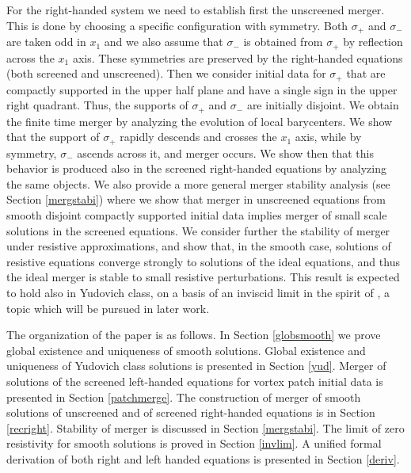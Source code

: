 \documentclass[11pt,reqno]{amsproc}
\begin{document}
For the right-handed system we need to establish first the unscreened merger. This is done by choosing a
specific configuration with symmetry. Both $\sigma_+$ and $\sigma_-$ are taken odd in $x_1$ and we also assume that $\sigma_-$ is obtained from $\sigma_+$ by reflection across the $x_1$ axis. These symmetries are preserved by the right-handed equations (both screened and unscreened). Then we consider initial data for $\sigma_+$ that are compactly supported in the upper half plane and have a single sign in the upper right quadrant. Thus, the supports of $\sigma_+$ and $\sigma_-$ are initially disjoint. We obtain the finite time merger by analyzing the evolution of local barycenters. We show that the support of $\sigma_+$ rapidly descends and crosses the $x_1$ axis, while by symmetry, $\sigma_-$ ascends across it, and merger occurs. We show then that this behavior is produced also in the screened right-handed equations by analyzing the same objects. We also provide a more general merger stability analysis (see Section \ref{mergstabi}) where we show that merger in unscreened equations from smooth disjoint compactly supported initial data implies merger of small scale solutions in the screened equations. We consider further the stability of merger under resistive approximations, and show that, in the smooth case, solutions of resistive equations converge strongly to solutions of the ideal equations, and thus the ideal merger is stable to small resistive perturbations. This result is expected to hold also in Yudovich class, on a basis of an inviscid limit in the spirit of \cite{cde}, a topic which will be pursued in later work. 

The organization of the paper is as follows. In Section \ref{globsmooth} we prove global existence and uniqueness of smooth solutions. Global existence and uniqueness of Yudovich class solutions is presented in Section \ref{yud}. Merger of solutions of the screened left-handed equations for vortex patch initial data is presented in Section \ref{patchmerge}. The construction of merger of smooth solutions of unscreened and of screened right-handed equations is in Section \ref{recright}. Stability of merger is discussed in Section \ref{mergstabi}. The limit of zero resistivity for smooth solutions is proved in Section \ref{invlim}. A unified formal derivation of both right and left handed equations is presented in Section \ref{deriv}.

 
\end{document}
